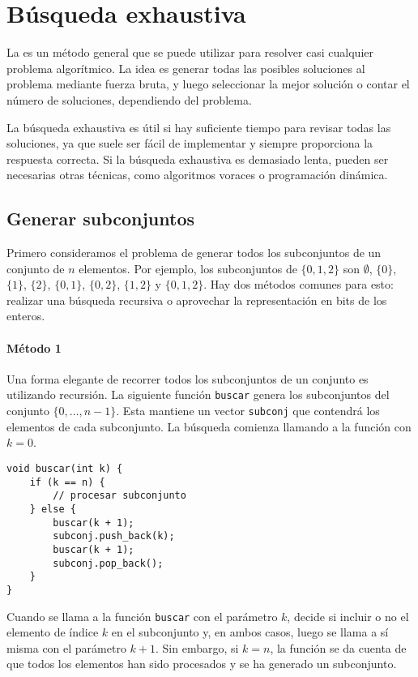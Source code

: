 \chapter{Búsqueda exhaustiva}

La 
es un método general que se puede utilizar
para resolver casi cualquier problema algorítmico.
La idea es generar todas las posibles
soluciones al problema mediante fuerza bruta,
y luego seleccionar la mejor solución o contar el
número de soluciones, dependiendo del problema.

La búsqueda exhaustiva es útil
si hay suficiente tiempo para revisar todas las soluciones,
ya que suele ser fácil de implementar
y siempre proporciona la respuesta correcta.
Si la búsqueda exhaustiva es demasiado lenta,
pueden ser necesarias otras técnicas, como algoritmos voraces o
programación dinámica.

\section{Generar subconjuntos}


Primero consideramos el problema de generar
todos los subconjuntos de un conjunto de $n$ elementos.
Por ejemplo, los subconjuntos de $\{0,1,2\}$ son
$\emptyset$, $\{0\}$, $\{1\}$, $\{2\}$, $\{0,1\}$,
$\{0,2\}$, $\{1,2\}$ y $\{0,1,2\}$.
Hay dos métodos comunes para esto:
realizar una búsqueda recursiva
o aprovechar la representación en bits de los enteros.

\subsubsection{Método 1}

Una forma elegante de recorrer todos los subconjuntos
de un conjunto es utilizando recursión.
La siguiente función \texttt{buscar}
genera los subconjuntos del conjunto
$\{0,\ldots,n-1\}$.
Esta mantiene un vector \texttt{subconj}
que contendrá los elementos de cada subconjunto.
La búsqueda comienza llamando
a la función con $k = 0$.

\begin{lstlisting}
void buscar(int k) {
    if (k == n) {
        // procesar subconjunto
    } else {
        buscar(k + 1);
        subconj.push_back(k);
        buscar(k + 1);
        subconj.pop_back();
    }
}
\end{lstlisting}

Cuando se llama a la función \texttt{buscar}
con el parámetro $k$,
decide si incluir o no el
elemento de índice $k$ en el subconjunto
y, en ambos casos,
luego se llama a sí misma con el parámetro $k+1$.
Sin embargo, si $k=n$, la función se da cuenta de que
todos los elementos han sido procesados
y se ha generado un subconjunto.

